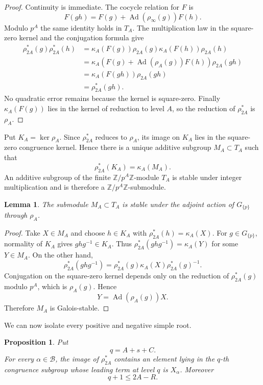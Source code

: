 \documentclass[11pt]{amsart}
\numberwithin{equation}{section}
\newcommand{\Z}{\mathbb Z}
\newcommand{\Ad}{\operatorname{Ad}}
\newtheorem{proposition}[theorem]{Proposition}
\newtheorem{lemma}[theorem]{Lemma}
\theoremstyle{definition}
\begin{document}
\begin{proof}
Continuity is immediate.  The cocycle relation for $F$ is
\[
 F(gh)=F(g)+\Ad(\rho_\infty(g))F(h).
\]
Modulo $p^A$ the same identity holds in $T_A$.  The multiplication law
in the square-zero kernel and the conjugation formula give
\begin{align*}
 \rho_{2A}^*(g)\rho_{2A}^*(h)
 &=\kappa_A(F(g))\rho_{2A}(g)
   \kappa_A(F(h))\rho_{2A}(h)\\
 &=\kappa_A\!\left(
   F(g)+\Ad(\rho_A(g))F(h)
   \right)\rho_{2A}(gh)\\
 &=\kappa_A(F(gh))\rho_{2A}(gh)\\
 &=\rho_{2A}^*(gh).
\end{align*}
No quadratic error remains because the kernel is square-zero.  Finally
$\kappa_A(F(g))$ lies in the kernel of reduction to level $A$, so the
reduction of $\rho_{2A}^*$ is $\rho_A$.
\end{proof}

Put $K_A=\ker\rho_A$. Since $\rho_{2A}^*$ reduces to $\rho_A$, its
image on $K_A$ lies in the square-zero congruence kernel.  Hence there
is a unique additive subgroup $M_A\subset T_A$ such that
\begin{equation}\label{eq:def-MA}
        \rho_{2A}^*(K_A)=\kappa_A(M_A).
\end{equation}
An additive subgroup of the finite $\Z/p^A\Z$-module $T_A$ is stable
under integer multiplication and is therefore a
$\Z/p^A\Z$-submodule.

\begin{lemma}\label{lem:M-stable}
The submodule $M_A\subset T_A$ is stable under the adjoint action of
$G_{\{p\}}$ through $\rho_A$.
\end{lemma}

\begin{proof}
Take $X\in M_A$ and choose $h\in K_A$ with
$\rho_{2A}^*(h)=\kappa_A(X)$. For $g\in G_{\{p\}}$, normality of
$K_A$ gives $ghg^{-1}\in K_A$. Thus
$\rho_{2A}^*(ghg^{-1})=\kappa_A(Y)$ for some $Y\in M_A$. On the other
hand,
\[
 \rho_{2A}^*(ghg^{-1})
 =\rho_{2A}^*(g)\kappa_A(X)\rho_{2A}^*(g)^{-1}.
\]
Conjugation on the square-zero kernel depends only on the reduction of
$\rho_{2A}^*(g)$ modulo $p^A$, which is $\rho_A(g)$. Hence
\[
        Y=\Ad(\rho_A(g))X.
\]
Therefore $M_A$ is Galois-stable.
\end{proof}

We can now isolate every positive and negative simple root.

\begin{proposition}\label{prop:initial-roots}
Put
\begin{equation}\label{eq:q-root-depth}
        q=A+s+C.
\end{equation}
For every $\alpha\in\mathcal B$, the image of $\rho_{2A}^*$ contains
an element lying in the $q$-th congruence subgroup whose leading term
at level $q$ is $X_\alpha$.  Moreover
\begin{equation}\label{eq:q-below-window}
        q+1\le2A-R.
\end{equation}
\end{proposition}
\end{document}
